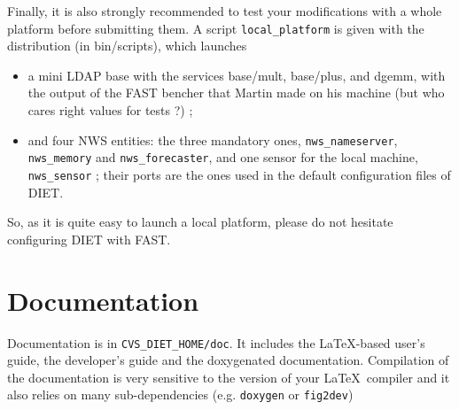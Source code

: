 Finally, it is also strongly recommended to test your modifications
with a whole platform before submitting them.
A script \texttt{local\_platform} is given with the distribution
(in \textsf{bin/scripts}), which launches
\begin{itemize}
\item a mini LDAP base with the services \textsf{base/mult},
  \textsf{base/plus}, and \textsf{dgemm}, with the output of the FAST
  bencher that Martin made on his machine (but who cares right values
  for tests ?) ;
\item and four NWS entities: the three mandatory ones,
  \texttt{nws\_nameserver}, \texttt{nws\_memory} and
  \texttt{nws\_forecaster}, and one sensor for the local machine,
  \texttt{nws\_sensor} ; their ports are the ones used in the default
  configuration files of DIET.
\end{itemize}
So, as it is quite easy to launch a local platform, please do not
hesitate configuring DIET with FAST.

\section{Documentation}
\label{section:compiling-documentation}

Documentation is in \verb+CVS_DIET_HOME/doc+. It includes the LaTeX-based 
user's guide, the developer's guide and the doxygenated documentation.
Compilation of the documentation is very sensitive to the version of your
\LaTeX\ compiler and it also relies on many sub-dependencies
  (e.g. \verb+doxygen+ or \verb+fig2dev+)

